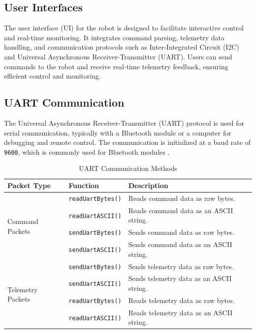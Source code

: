 \subsection{User Interfaces}
The user interface (UI) for the robot is designed to facilitate interactive control and real-time monitoring. It integrates command parsing, telemetry data handling, and communication protocols such as Inter-Integrated Circuit (I2C) and Universal Asynchronous Receiver-Transmitter (UART). Users can send commands to the robot and receive real-time telemetry feedback, ensuring efficient control and monitoring.

\subsection{UART Communication}
The Universal Asynchronous Receiver-Transmitter (UART) protocol is used for serial communication, typically with a Bluetooth module or a computer for debugging and remote control. The communication is initialized at a baud rate of \texttt{9600}, which is commonly used for Bluetooth modules \cite{bluetooth_module}.

\begin{table}[h]
	\centering
	\caption{UART Communication Methods}
	\begin{tabular}{|l|l|l|}
		\hline
		\textbf{Packet Type} & \textbf{Function} & \textbf{Description} \\ \hline
		\multirow{4}{*}{Command Packets} & \texttt{readUartBytes()} & Reads command data as raw bytes. \\ \cline{2-3}
		& \texttt{readUartASCII()} & Reads command data as an ASCII string. \\ \cline{2-3}
		& \texttt{sendUartBytes()} & Sends command data as raw bytes. \\ \cline{2-3}
		& \texttt{sendUartASCII()} & Sends command data as an ASCII string. \\ \hline
		\multirow{4}{*}{Telemetry Packets} & \texttt{sendUartBytes()} & Sends telemetry data as raw bytes. \\ \cline{2-3}
		& \texttt{sendUartASCII()} & Sends telemetry data as an ASCII string. \\ \cline{2-3}
		& \texttt{readUartBytes()} & Reads telemetry data as raw bytes. \\ \cline{2-3}
		& \texttt{readUartASCII()} & Reads telemetry data as an ASCII string. \\ \hline
	\end{tabular}
	\label{tab:uart_methods}
\end{table}

